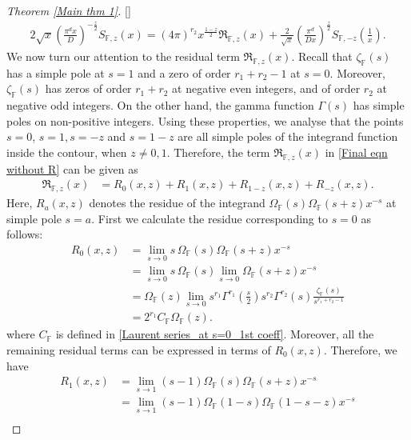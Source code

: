 \documentclass[12pt,reqno]{amsart}
\renewcommand{\(}{\left\(}
\renewcommand{\)}{\right\)}
\renewcommand{\[}{\left\[}
\renewcommand{\]}{\right\]}
\numberwithin{equation}{section}
\theoremstyle{plain}
\begin{document}
\begin{proof}[Theorem \rm{\ref{Main thm 1}}][]
\begin{align}\label{Final eqn without R}
2\sqrt{x}\left(\frac{\pi^d x}{D}\right)^{-\frac{z}{2}}S_{\mathbb{F}, z}(x) = (4\pi)^{r_2}x^{\frac{1-z}{2}}\mathfrak{R}_{\mathbb{F}, z}(x) + \frac{2}{\sqrt{x}} \left(\frac{\pi^d}{Dx}\right)^{\frac{z}{2}}S_{\mathbb{F}, -z}\left(\frac{1}{x}\right).
\end{align}
We now turn our attention to the residual term $\mathfrak{R}_{\mathbb{F}, z}(x)$. Recall that $\zeta_{\mathbb{F}}(s)$ has a simple pole at $s=1$ and a zero of order $r_1+r_2-1$ at $s=0$. Moreover, $\zeta_{\mathbb{F}}(s)$ has
zeros of order $r_1 + r_2$ at negative even integers, and of order $r_2$ at negative odd integers. On the other hand, the gamma function $\Gamma(s)$ has simple poles on non-positive integers. Using these properties, we analyse that the points $s = 0$, $s=1, s= -z$ and $s=1-z$ are all simple poles of the integrand function inside the contour, when $z \neq 0, 1$.
Therefore, the term $\mathfrak{R}_{\mathbb{F}, z}(x)$ in \eqref{Final eqn without R} can be given as
\begin{align*}
\mathfrak{R}_{\mathbb{F}, z}(x) &= 
R_{0}(x,z) + R_{1}(x,z) + R_{1-z}(x,z) + R_{-z}(x,z).
\end{align*}
Here, $R_{a}(x,z)$ denotes the residue of the integrand $\Omega_{\mathbb{F}}(s)\Omega_{\mathbb{F}}(s+z)x^{-s}$ at simple pole $s=a$. First we calculate the residue corresponding to $s = 0$ as follows:
\begin{align*}
R_{0}(x,z) &= \lim_{s \rightarrow 0} s\,\Omega_{\mathbb{F}}(s)\Omega_{\mathbb{F}}(s+z)x^{-s} \\
&= \lim_{s \rightarrow 0} s\,\Omega_{\mathbb{F}}(s)\lim_{s \rightarrow 0}\Omega_{\mathbb{F}}(s+z)x^{-s} \\
&= \Omega_{\mathbb{F}}(z)\lim_{s \rightarrow 0}s^{r_1}\Gamma^{r_1}\left(\frac{s}{2}\right)s^{r_2}\Gamma^{r_2}(s)\frac{\zeta_{\mathbb{F}}(s)}{s^{r_1+r_2-1}} \\
&= 2^{r_1}C_{\mathbb{F}}\Omega_{\mathbb{F}}(z).
\end{align*}
where $C_\mathbb{F}$ is defined in \eqref{Laurent series_at s=0_1st coeff}. Moreover, all the remaining residual terms can be expressed in terms of $R_{0}(x,z)$. Therefore, we have
{\allowdisplaybreaks
\begin{align*}
R_{1}(x,z) &= \lim_{s \rightarrow 1} (s-1)\Omega_{\mathbb{F}}(s)\Omega_{\mathbb{F}}(s+z)x^{-s} \\
&= \lim_{s \rightarrow 1} (s-1)\Omega_{\mathbb{F}}(1-s)\Omega_{\mathbb{F}}(1-s-z)x^{-s}\\

\end{align*}}
\end{proof}
\end{document}
